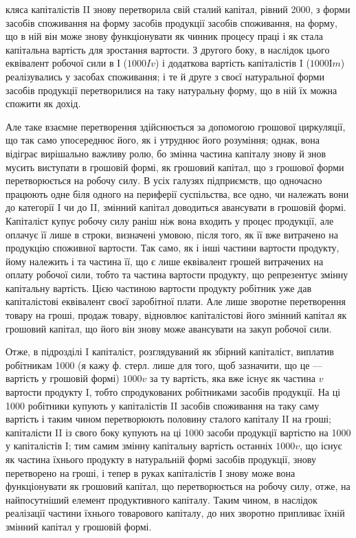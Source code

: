 \parcont{}  %
кляса капіталістів II знову перетворила свій сталий капітал, рівний 2000,
з форми засобів споживання на форму засобів продукції засобів споживання,
на форму, що в ній він може знову функціонувати як чинник
процесу праці і як стала капітальна вартість для зростання вартости. З
другого боку, в наслідок цього еквівалент робочої сили в І ($1000 Iv$)
і додаткова вартість капіталістів I ($1000 Іm$) реалізувались у засобах
споживання; і те й друге з своєї натуральної форми засобів продукції перетворилися
на таку натуральну форму, що в ній їх можна спожити як дохід.

Але таке взаємне перетворення здійснюється за допомогою грошової
циркуляції, що так само упосереднює його, як і утруднює його розуміння;
однак, вона відіграє вирішально важливу ролю, бо змінна частина капіталу
знову й знов мусить виступати в грошовій формі, як грошовий капітал,
що з грошової форми перетворюється на робочу силу. В усіх галузях
підприємств, що одночасно працюють одне біля одного на периферії
суспільства, все одно, чи належать вони до категорії I чи до II, змінний
капітал доводиться авансувати в грошовій формі. Капіталіст купує
робочу силу раніш ніж вона входить у процес продукції, але оплачує її
лише в строки, визначені умовою, після того, як її вже витрачено на
продукцію споживної вартости. Так само, як і інші частини вартости
продукту, йому належить і та частина її, що є лише еквівалент грошей
витрачених на оплату робочої сили, тобто та частина вартости продукту,
що репрезентує змінну капітальну вартість. Цією частиною вартости продукту
робітник уже дав капіталістові еквівалент своєї заробітної плати. Але
лише зворотне перетворення товару на гроші, продаж товару, відновлює
капіталістові його змінний капітал як грошовий капітал, що його він
знову може авансувати на закуп робочої сили.

Отже, в підрозділі I капіталіст, розглядуваний як збірний капіталіст,
виплатив робітникам 1000 (я кажу ф. стерл. лише для того,
щоб зазначити, що це — вартість у грошовій формі) \deq{} $1000v$ за
ту вартість, яка вже існує як частина $v$ вартости продукту I, тобто спродукованих
робітниками засобів продукції. На ці 1000 робітники
купують у капіталістів II засобів споживання на таку саму вартість і таким
чином перетворюють половину сталого капіталу II на гроші; капіталісти II
із свого боку купують на ці 1000 засоби продукції вартістю
на 1000 у капіталістів I; тим самим змінну капітальну вартість останніх
\deq{} $1000 v$, що існує як частина їхнього продукту в натуральній формі
засобів продукції, знову перетворено на гроші, і тепер в руках капіталістів
І знову може вона функціонувати як грошовий капітал, що перетворюється
на робочу силу, отже, на найпосутніший елемент продуктивного
капіталу. Таким чином, в наслідок реалізації частини їхнього товарового
капіталу, до них зворотно припливає їхній змінний капітал у
грошовій формі.

